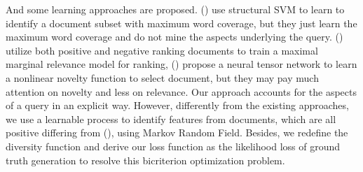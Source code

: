 \documentclass[review]{elsarticle}
\begin{document}
{%


And some learning approaches are proposed. (\cite{zhu2014learning}) use structural SVM to learn to identify a document subset with maximum word coverage, but they just learn the maximum word coverage and do not mine the aspects underlying the query. (\cite{Xia:2015:LMM:2766462.2767710}) utilize both positive and negative ranking documents to train a maximal marginal relevance model for ranking, (\cite{Xia:2016:MDN:2911451.2911498}) propose a neural tensor network to learn a nonlinear novelty function to select document, but they may pay much attention on novelty and less on relevance.
Our approach accounts for the aspects of a query in an explicit way. However, differently from the existing approaches, we use a learnable process to identify features from documents, which are all positive differing from (\cite{Xia:2015:LMM:2766462.2767710}), using Markov Random Field. Besides, we redefine the diversity function and derive our loss function as the likelihood loss of ground truth generation to resolve this bicriterion optimization problem.}




\end{document}
